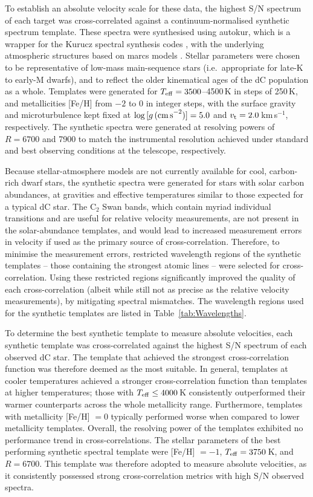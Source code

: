 \documentclass[fleqn,usenatbib,useAMS]{mnras}
\begin{document}
To establish an absolute velocity scale for these data, the highest S/N spectrum of each target was cross-correlated against a continuum-normalised synthetic spectrum template.  These spectra were synthesised using {\sc autokur}, which is a wrapper for the Kurucz spectral synthesis codes \citep{Kurucz2005}, with the underlying atmospheric structures based on {\sc marcs} models \citep{Marcs08}.  Stellar parameters were chosen to be representative of low-mass main-sequence stars (i.e.\ appropriate for late-K to early-M dwarfs), and to reflect the older kinematical ages of the dC population as a whole.  Templates were generated for $T_{\rm eff}=3500$--4500\,K in steps of 250\,K, and metallicities [Fe/H] from $-2$ to $0$ in integer steps, with the surface gravity and microturbulence kept fixed at $\log\,[g\,{\rm (cm\,s}^{-2})] = 5.0$ and $v_{\rm t} = 2.0\,$km\,s$^{-1}$, respectively.  The synthetic spectra were generated at resolving powers of $R=6700$ and 7900 to match the instrumental resolution achieved under standard and best observing conditions at the telescope, respectively.  

Because stellar-atmosphere models are not currently available for cool, carbon-rich dwarf stars, the synthetic spectra were generated for stars with solar carbon abundances, at gravities and effective temperatures similar to those expected for a typical dC star.  The C$_2$ Swan bands, which contain myriad individual transitions and are useful for relative velocity measurements, are not present in the solar-abundance templates, and would lead to increased measurement errors in velocity if used as the primary source of cross-correlation.  Therefore, to minimise the measurement errors, restricted wavelength regions of the synthetic templates -- those containing the strongest atomic lines -- were selected for cross-correlation.  Using these restricted regions significantly improved the quality of each cross-correlation (albeit while still not as precise as the relative velocity measurements), by mitigating spectral mismatches.  The wavelength regions used for the synthetic templates are listed in Table~\ref{tab:Wavelengths}.

To determine the best synthetic template to measure absolute velocities, each synthetic template was cross-correlated against the highest S/N spectrum of each observed dC star.  The template that achieved the strongest cross-correlation function was therefore deemed as the most suitable.  In general, templates at cooler temperatures achieved a stronger cross-correlation function than templates at higher temperatures; those with $T_{\rm eff}\leq4000$\,K consistently outperformed their warmer counterparts across the whole metallicity range.  Furthermore, templates with metallicity [Fe/H] $= 0$ typically performed worse when compared to lower metallicity templates.  Overall, the resolving power of the templates exhibited no performance trend in cross-correlations.  The stellar parameters of the best performing synthetic spectral template were [Fe/H] $= -1$, $T_{\rm eff}=3750$\,K, and $R=6700$.  This template was therefore adopted to measure absolute velocities, as it consistently possessed strong cross-correlation metrics with high S/N observed spectra.  
\end{document}
